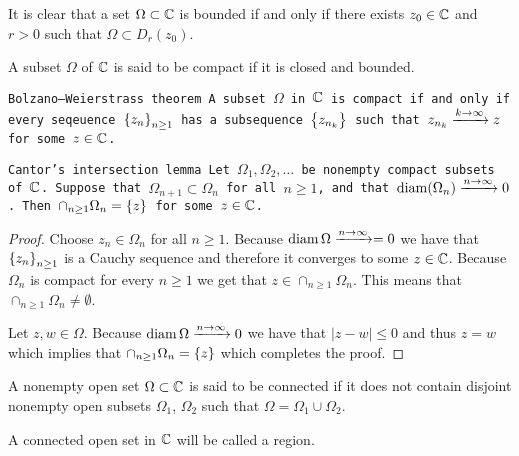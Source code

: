 \documentclass[11pt,a4paper]{article}
\begin{document}
\begin{remark}
  It is clear that a set $\Omega \subset \mathbb{C}$ is bounded if and only if
  there exists $z_0 \in \mathbb{C}$ and $r > 0$ such that $\Omega \subset D_r(z_0)$.
\end{remark}

\begin{definition}
  A subset $\Omega$ of $\mathbb{C}$ is said to be compact if it is closed and 
  bounded.
\end{definition}

\begin{theorem}\tt{Bolzano--Weierstrass theorem}
  A subset $\Omega$ in $\mathbb{C}$ is compact if and only if every seqeuence
  $\set{z_n}_{n \geq 1}$ has a subsequence $\set{z_{n_k}}$ such that
  $z_{n_k} \xrightarrow{k \to \infty} z$ for some $z \in \mathbb{C}$.
\end{theorem}

\begin{theorem}\tt{Cantor's intersection lemma}
  Let $\Omega_1, \Omega_2, \dots$ be nonempty compact subsets of $\mathbb{C}$.
  Suppose that $\Omega_{n+1} \subset \Omega_n$ for all $n \geq 1$,
  and that $\operatorname{diam}(\Omega_n) \xrightarrow{n \to \infty} 0$.
  Then $\cap_{n \geq 1} \Omega_n = \set{z}$ for some $z \in \mathbb{C}$.
\end{theorem}
\begin{proof}
  Choose $z_n \in \Omega_n$ for all $n \geq 1$.
  Because $\operatorname{diam} \Omega \xrightarrow{n \to \infty} = 0$ we have that
  $\set{z_n}_{n \geq 1}$ is a Cauchy sequence and therefore it converges
  to some $z \in \mathbb{C}$. Because $\Omega_n$ is compact for every $n \geq 1$
  we get that $z \in \cap_{n \geq 1} \Omega_n$.
  This means that $\cap_{n \geq 1} \Omega_n \neq \emptyset$.

  Let $z,w \in \Omega$.
  Because $\operatorname{diam} \Omega \xrightarrow{n \to \infty} 0$ we have that
  $|z - w| \le 0$ and thus $z = w$ which implies that
  $\cap_{n \geq 1} \Omega_n = \set{z}$ which completes the proof.
\end{proof}

\begin{definition}
  A nonempty open set $\Omega \subset \mathbb{C}$ is said to be connected if it does
  not contain disjoint nonempty open subsets $\Omega_1$, $\Omega_2$ such
  that $\Omega = \Omega_1 \cup \Omega_2$.
\end{definition}

\begin{definition}[Region]
  A connected open set in $\mathbb{C}$ will be called a region.
\end{definition}
\end{document}
